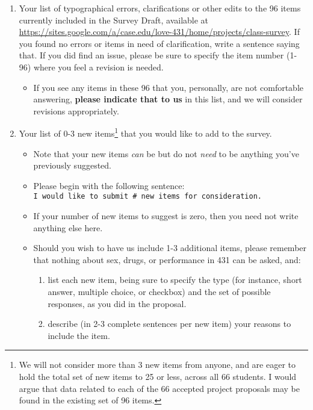 \documentclass[]{book}
\providecommand{\tightlist}{%
  \setlength{\itemsep}{0pt}\setlength{\parskip}{0pt}}
\let\rmarkdownfootnote\footnote%
\def\footnote{\protect\rmarkdownfootnote}
\theoremstyle{definition}
\theoremstyle{definition}
\theoremstyle{definition}
\theoremstyle{remark}
\begin{document}
\begin{enumerate}
\def\labelenumi{\arabic{enumi}.}
\tightlist
\item
  Your list of typographical errors, clarifications or other edits to
  the 96 items currently included in the Survey Draft, available at
  \url{https://sites.google.com/a/case.edu/love-431/home/projects/class-survey}.
  If you found no errors or items in need of clarification, write a
  sentence saying that. If you did find an issue, please be sure to
  specify the item number (1-96) where you feel a revision is needed.

  \begin{itemize}
  \tightlist
  \item
    If you see any items in these 96 that you, personally, are not
    comfortable answering, \textbf{please indicate that to us} in this
    list, and we will consider revisions appropriately.
  \end{itemize}
\item
  Your list of 0-3 new
  items\footnote{We will not consider more than 3 new items from anyone, and are eager to hold the total set of new items to 25 or less, across all 66 students. I would argue that data related to each of the 66 accepted project proposals may be found in the existing set of 96 items.}
  that you would like to add to the survey.

  \begin{itemize}
  \tightlist
  \item
    Note that your new items \emph{can} be but do not \emph{need} to be
    anything you've previously suggested.
  \item
    Please begin with the following sentence:
    \texttt{I\ would\ like\ to\ submit\ \#\ new\ items\ for\ consideration.}
  \item
    If your number of new items to suggest is zero, then you need not
    write anything else here.
  \item
    Should you wish to have us include 1-3 additional items, please
    remember that nothing about sex, drugs, or performance in 431 can be
    asked, and:

    \begin{enumerate}
    \def\labelenumii{\alph{enumii}.}
    \tightlist
    \item
      list each new item, being sure to specify the type (for instance,
      short answer, multiple choice, or checkbox) and the set of
      possible responses, as you did in the proposal.
    \item
      describe (in 2-3 complete sentences per new item) your reasons to
      include the item.


\end{enumerate}
\end{itemize}
\end{enumerate}
\end{document}
